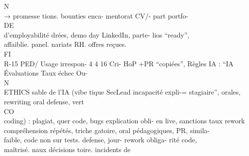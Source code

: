 \documentclass[12pt,landscape,a4paper]{article}
\begin{document}
\vspace{0.5em}
\vspace{0.5em}
\vspace{0.5em}
\vspace{0.5em}
N\\
→        promesse                         tions.              bounties   enca- mentorat     CV/- part     portfo-\\
\vspace{0.5em}
\vspace{0.5em}
\vspace{0.5em}
\vspace{0.5em}
DE\\
d’employabilité                                               drées, demo day LinkedIn, parte- lios “ready”,\\
affaiblie.                                                    panel.           nariats RH.        offres reçues.\\
\vspace{0.5em}
\vspace{0.5em}
\vspace{0.5em}
\vspace{0.5em}
FI\\
R-15       PED/     Usage irrespon- 4 4 16 Cri- HoP +PR          “copiées”, Règles IA : “IA Évaluations          Taux échec Ou-\\
\vspace{0.5em}
\vspace{0.5em}
\vspace{0.5em}
\vspace{0.5em}
N\\
ETHICS   sable de l’IA (vibe    tique SecLead incapacité expli-=        stagiaire”, orales, rewriting oral defense, vert\\
\vspace{0.5em}
\vspace{0.5em}
\vspace{0.5em}
\vspace{0.5em}
CO\\
coding) : plagiat,                   quer code, bugs explication obli- en live, sanctions taux rework\\
compréhension                        répétés, triche gatoire,         oral pédagogiques, PR,         simila-\\
faible, code non                     sur tests.         defense,     jour- rework obliga- rité         code,\\
maîtrisé.                                               naux décisions toire.                incidents de\\
\end{document}
